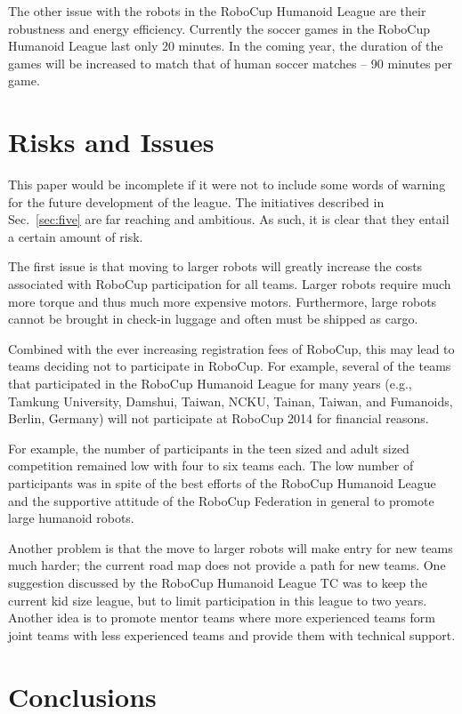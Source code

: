 \documentclass{llncs}
\begin{document}
The other issue with the robots in the RoboCup Humanoid League are
their robustness and energy efficiency. Currently the soccer games in
the RoboCup Humanoid League last only 20 minutes. In the coming year,
the duration of the games will be increased to match that of human
soccer matches -- 90 minutes per game.

\section{Risks and Issues}
\label{sec:seven}

This paper would be incomplete if it were not to include some words of
warning for the future development of the league. The initiatives
described in Sec.~\ref{sec:five} are far reaching and ambitious. As
such, it is clear that they entail a certain amount of risk.

The first issue is that moving to larger robots will greatly increase
the costs associated with RoboCup participation for all teams. Larger
robots require much more torque and thus much more expensive
motors. Furthermore, large robots cannot be brought in check-in
luggage and often must be shipped as cargo.

Combined with the ever increasing registration fees of RoboCup, this
may lead to teams deciding not to participate in RoboCup. For example,
several of the teams that participated in the RoboCup Humanoid League
for many years (e.g., Tamkung University, Damshui, Taiwan, NCKU,
Tainan, Taiwan, and Fumanoids, Berlin, Germany) will not participate
at RoboCup 2014 for financial reasons.

For example, the number of participants in the teen sized and adult
sized competition remained low with four to six teams each. The low
number of participants was in spite of the best efforts of the RoboCup
Humanoid League and the supportive attitude of the RoboCup Federation
in general to promote large humanoid robots.

Another problem is that the move to larger robots will make entry for
new teams much harder; the current road map does not provide a path
for new teams. One suggestion discussed by the RoboCup Humanoid League
TC was to keep the current kid size league, but to limit participation
in this league to two years. Another idea is to promote mentor teams
where more experienced teams form joint teams with less experienced
teams and provide them with technical support.

\section{Conclusions}
\label{sec:six}
\end{document}
